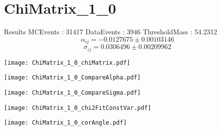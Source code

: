 \documentclass[a4paper,12pt]{article}
\begin{document}
\section{ChiMatrix\_1\_0}
\begin{minipage}{0.49\linewidth} Results \newline
MCEvents : 31417\newline
DataEvents : 3946 \newline
ThresholdMass : 54.2312\\
$$\alpha_{ij} = -0.0127675\pm 0.00103146$$
$$\sigma_{ij} = 0.0306496\pm 0.00209962$$
\end{minipage}\hfill
\begin{minipage}{0.49\linewidth} 
\texttt{[image: ChiMatrix\_1\_0\_chiMatrix.pdf]}\\
\end{minipage}
\hfill
\begin{minipage}{0.49\linewidth} 
\texttt{[image: ChiMatrix\_1\_0\_CompareAlpha.pdf]}\\
\end{minipage}
\hfill
\begin{minipage}{0.49\linewidth} 
\texttt{[image: ChiMatrix\_1\_0\_CompareSigma.pdf]}\\
\end{minipage}
\begin{minipage}{0.49\linewidth} 
\texttt{[image: ChiMatrix\_1\_0\_chi2FitConstVar.pdf]}\\
\end{minipage}
\hfill
\begin{minipage}{0.49\linewidth} 
\texttt{[image: ChiMatrix\_1\_0\_corAngle.pdf]}\\
\end{minipage}
\end{document}

